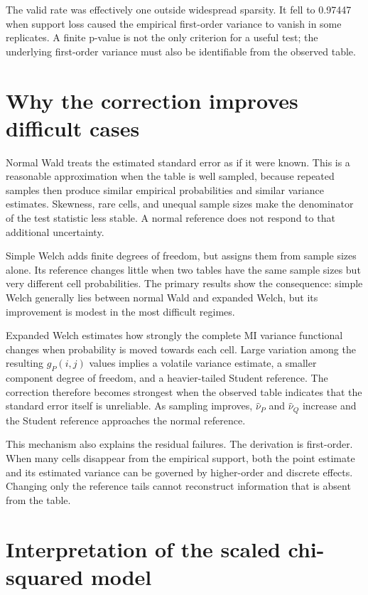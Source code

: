 The valid rate was effectively one outside widespread sparsity. It fell to
0.97447 when support loss caused the empirical first-order variance to vanish
in some replicates. A finite p-value is not the only criterion for a useful
test; the underlying first-order variance must also be identifiable from the
observed table.

\section{Why the correction improves difficult cases}

Normal Wald treats the estimated standard error as if it were known. This is
a reasonable approximation when the table is well sampled, because repeated
samples then produce similar empirical probabilities and similar variance
estimates. Skewness, rare cells, and unequal sample sizes make the denominator
of the test statistic less stable. A normal reference does not respond to
that additional uncertainty.

Simple Welch adds finite degrees of freedom, but assigns them from sample
sizes alone. Its reference changes little when two tables have the same
sample sizes but very different cell probabilities. The primary results show
the consequence: simple Welch generally lies between normal Wald and expanded
Welch, but its improvement is modest in the most difficult regimes.

Expanded Welch estimates how strongly the complete MI variance functional
changes when probability is moved towards each cell. Large variation among
the resulting $g_P(i,j)$ values implies a volatile variance estimate, a
smaller component degree of freedom, and a heavier-tailed Student reference.
The correction therefore becomes strongest when the observed table indicates
that the standard error itself is unreliable. As sampling improves,
$\widehat\nu_P$ and $\widehat\nu_Q$ increase and the Student reference
approaches the normal reference.

This mechanism also explains the residual failures. The derivation is
first-order. When many cells disappear from the empirical support, both the
point estimate and its estimated variance can be governed by higher-order and
discrete effects. Changing only the reference tails cannot reconstruct
information that is absent from the table.

\section{Interpretation of the scaled chi-squared model}

